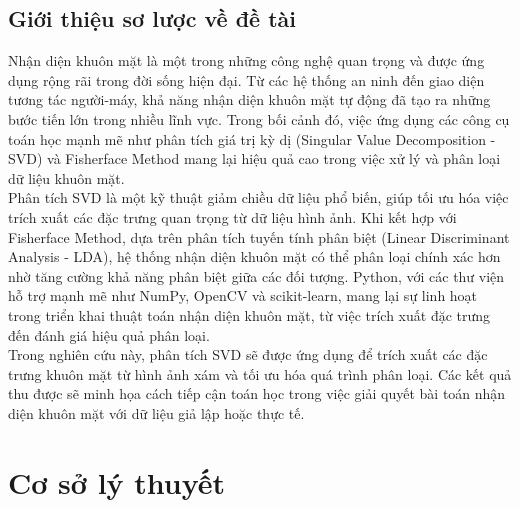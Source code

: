 \documentclass[a4paper,12pt]{extarticle}
\begin{document}
\subsection{Giới thiệu sơ lược về đề tài}
Nhận diện khuôn mặt là một trong những công nghệ quan trọng và được ứng dụng rộng rãi trong đời sống hiện đại. Từ các hệ thống an ninh đến giao diện tương tác người-máy, khả năng nhận diện khuôn mặt tự động đã tạo ra những bước tiến lớn trong nhiều lĩnh vực. Trong bối cảnh đó, việc ứng dụng các công cụ toán học mạnh mẽ như phân tích giá trị kỳ dị (Singular Value Decomposition - SVD) và Fisherface Method mang lại hiệu quả cao trong việc xử lý và phân loại dữ liệu khuôn mặt. \\
Phân tích SVD là một kỹ thuật giảm chiều dữ liệu phổ biến, giúp tối ưu hóa việc trích xuất các đặc trưng quan trọng từ dữ liệu hình ảnh. Khi kết hợp với Fisherface Method, dựa trên phân tích tuyến tính phân biệt (Linear Discriminant Analysis - LDA), hệ thống nhận diện khuôn mặt có thể phân loại chính xác hơn nhờ tăng cường khả năng phân biệt giữa các đối tượng. Python, với các thư viện hỗ trợ mạnh mẽ như NumPy, OpenCV và scikit-learn, mang lại sự linh hoạt trong triển khai thuật toán nhận diện khuôn mặt, từ việc trích xuất đặc trưng đến đánh giá hiệu quả phân loại.\\
Trong nghiên cứu này, phân tích SVD sẽ được ứng dụng để trích xuất các đặc trưng khuôn mặt từ hình ảnh xám và tối ưu hóa quá trình phân loại. Các kết quả thu được sẽ minh họa cách tiếp cận toán học trong việc giải quyết bài toán nhận diện khuôn mặt với dữ liệu giả lập hoặc thực tế.
\section{Cơ sở lý thuyết}
\end{document}
